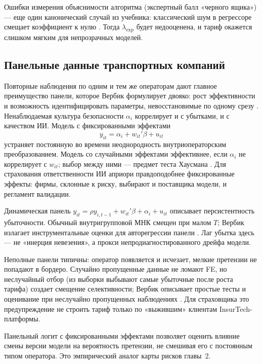 \documentclass[a4paper,14pt]{extarticle}
\begin{document}
Ошибки измерения объяснимости алгоритма (экспертный балл «черного ящика») --- еще один канонический случай из учебника: классический шум в регрессоре смещает коэффициент к нулю \cite{verbeek}. Тогда $\lambda_{\mathrm{exp}}$ будет недооценена, и тариф окажется слишком мягким для непрозрачных моделей.

\subsection{Панельные данные транспортных компаний}

Повторные наблюдения по одним и тем же операторам дают главное преимущество панели, которое Вербик формулирует двояко: рост эффективности и возможность идентифицировать параметры, невосстановимые по одному срезу \cite{verbeek}. Ненаблюдаемая культура безопасности $\alpha_i$ коррелирует и с убытками, и с качеством ИИ. Модель с фиксированными эффектами
\begin{equation}
y_{it}=\alpha_i+w_{it}'\beta+u_{it}
\label{eq:fe}
\end{equation}
устраняет постоянную во времени неоднородность внутриоператорским преобразованием. Модель со случайными эффектами эффективнее, если $\alpha_i$ не коррелирует с $w_{it}$; выбор между ними --- предмет теста Хаусмана \cite{verbeek}. Для страхования ответственности ИИ априори правдоподобнее фиксированные эффекты: фирмы, склонные к риску, выбирают и поставщика модели, и регламент валидации.

Динамическая панель $y_{it}=\rho y_{i,t-1}+w_{it}'\beta+\alpha_i+u_{it}$ описывает персистентность убыточности. Обычный внутригрупповой МНК смещен при малом $T$; Вербик излагает инструментальные оценки для авторегрессии панели \cite{verbeek}. Лаг убытка здесь --- не «инерция невезения», а прокси непродиагностированного дрейфа модели.

Неполные панели типичны: оператор появляется и исчезает, мелкие претензии не попадают в бордеро. Случайно пропущенные данные не ломают FE, но неслучайный отбор (из выборки выбывают самые убыточные после роста тарифа) создает смещение селективности; Вербик описывает простые тесты и оценивание при неслучайно пропущенных наблюдениях \cite{verbeek}. Для страховщика это предупреждение не строить тариф только по «выжившим» клиентам InsurTech-платформы.

Панельный логит с фиксированными эффектами позволяет оценить влияние смены версии модели на вероятность претензии, не смешивая его с постоянным типом оператора. Это эмпирический аналог карты рисков главы~2.
\end{document}
